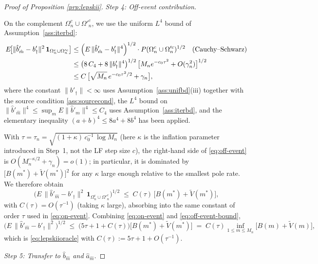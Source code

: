 \begin{proof}[Proof of Proposition \ref{prp:lepskii}]
\smallskip
\emph{Step 4: Off-event contribution.}

On the complement $\Omega_n^c \cup \Omega'^c_n$, we use the uniform
$L^4$ bound of Assumption~\ref{ass:iterbd}: %
\begin{align}
E\!\bigl[\|\hat b'_{\hat m} - b'_\dagger\|^2\,\mathbf 1_{\Omega_n^c \cup \Omega'^c_n}\bigr]
&\le \Bigl(E\,\|\hat b'_{\hat m} - b'_\dagger\|^4\Bigr)^{1/2}
   \cdot P(\Omega_n^c \cup \Omega'^c_n)^{1/2}
   \quad \text{(Cauchy--Schwarz)} \nonumber \\
&\le \bigl(8\,C_4 + 8\,\|b'_\dagger\|^4\bigr)^{1/2}\,
   \bigl[M_n e^{-c_0\tau^2} + O(\gamma_n^2)\bigr]^{1/2} \nonumber \\
&\le C\,\bigl[\sqrt{M_n}\,e^{-c_0\tau^2/2} + \gamma_n\bigr],
\label{eq:off-event}
\end{align}
where the constant $\|b'_\dagger\| < \infty$ uses
Assumption~\ref{ass:unifbd}\textup{(iii)} together with the source
condition \ref{ass:sourcecond}, the $L^4$ bound on
$\|\hat b'_{\hat m}\|^4 \le \sup_m E\|\hat b'_m\|^4 \le C_4$ uses
Assumption~\ref{ass:iterbd}, and the elementary inequality
$(a+b)^4 \le 8 a^4 + 8 b^4$ has been applied.

With $\tau = \tau_n = \sqrt{(1+\kappa)\,c_0^{-1}\,\log M_n}$ (here $\kappa$ is
the inflation parameter introduced in Step~1, not the LF step size $c$),
the right-hand side of \eqref{eq:off-event} is $O(M_n^{-\kappa/2} + \gamma_n)
= o(1)$; in particular, it is dominated by
$\bigl[B(m^*) + \tilde V(m^*)\bigr]^2$ for any $\kappa$ large enough relative
to the smallest pole rate. We therefore obtain
\begin{equation}\label{eq:off-event-bound}
\bigl(E\,\|\hat b'_{\hat m} - b'_\dagger\|^2\,\mathbf 1_{\Omega_n^c \cup
\Omega'^c_n}\bigr)^{1/2} \;\le\; C(\tau)\,\bigl[B(m^*) + \tilde V(m^*)\bigr],
\end{equation}
with $C(\tau) = O(\tau^{-1})$ (taking $\kappa$ large), absorbing into the same
constant of order $\tau$ used in \eqref{eq:on-event}. Combining
\eqref{eq:on-event} and \eqref{eq:off-event-bound},
\begin{equation}\label{eq:combined}
\bigl(E\,\|\hat b'_{\hat m} - b'_\dagger\|^2\bigr)^{1/2}
\;\le\; \bigl(5\tau + 1 + C(\tau)\bigr)\bigl[B(m^*) + \tilde V(m^*)\bigr]
\;=\; C(\tau)\inf_{1 \le m \le M_n}\bigl[B(m) + \tilde V(m)\bigr],
\end{equation}
which is \eqref{eq:lepskiioracle} with $C(\tau) := 5\tau + 1 + O(\tau^{-1})$.

\smallskip
\emph{Step 5: Transfer to $\hat b_{\hat m}$ and $\hat a_{\hat m}$.}


\end{proof}
